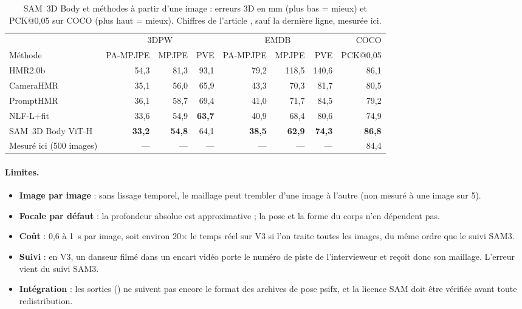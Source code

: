 \documentclass[11pt,a4paper]{report}
\newcommand{\code}[1]{\texttt{\detokenize{#1}}}
\begin{document}
\begin{table}[H]
\centering
\caption{SAM~3D Body et méthodes à partir d'une image : erreurs 3D en mm (plus bas = mieux) et PCK@0,05 sur COCO
(plus haut = mieux). Chiffres de l'article \cite{sam3dbody2026}, sauf la dernière ligne, mesurée ici.}
\label{tab:sam3d-lit}
\footnotesize
\setlength{\tabcolsep}{4pt}
\begin{tabular}{@{}lrrrrrrr@{}}
\toprule
 & \multicolumn{3}{c}{3DPW} & \multicolumn{3}{c}{EMDB} & COCO \\
\cmidrule(lr){2-4}\cmidrule(lr){5-7}\cmidrule(l){8-8}
Méthode & PA-MPJPE & MPJPE & PVE & PA-MPJPE & MPJPE & PVE & PCK@0,05 \\
\midrule
HMR2.0b & 54,3 & 81,3 & 93,1 & 79,2 & 118,5 & 140,6 & 86,1 \\
CameraHMR & 35,1 & 56,0 & 65,9 & 43,3 & 70,3 & 81,7 & 80,5 \\
PromptHMR & 36,1 & 58,7 & 69,4 & 41,0 & 71,7 & 84,5 & 79,2 \\
NLF-L+fit & 33,6 & 54,9 & \textbf{63,7} & 40,9 & 68,4 & 80,6 & 74,9 \\
SAM~3D Body ViT-H & \textbf{33,2} & \textbf{54,8} & 64,1 & \textbf{38,5} & \textbf{62,9} & \textbf{74,3} & \textbf{86,8} \\
\midrule
Mesuré ici (500 images) & --- & --- & --- & --- & --- & --- & 84,4 \\
\bottomrule
\end{tabular}
\end{table}

\paragraph{Limites.}
\begin{itemize}
    \item \textbf{Image par image} : sans lissage temporel, le maillage peut trembler d'une image à l'autre (non
    mesuré à une image sur 5).
    \item \textbf{Focale par défaut} : la profondeur absolue est approximative ; la pose et la forme du corps n'en
    dépendent pas.
    \item \textbf{Coût} : 0,6 à 1~s par image, soit environ 20$\times$ le temps réel sur V3 si l'on traite toutes
    les images, du même ordre que le suivi SAM3.
    \item \textbf{Suivi} : en V3, un danseur filmé dans un encart vidéo porte le numéro de piste de l'intervieweur et
    reçoit donc son maillage. L'erreur vient du suivi SAM3.
    \item \textbf{Intégration} : les sorties (\code{.npz}) ne suivent pas encore le format des archives de pose
    psifx, et la licence SAM doit être vérifiée avant toute redistribution.
\end{itemize}
\end{document}
